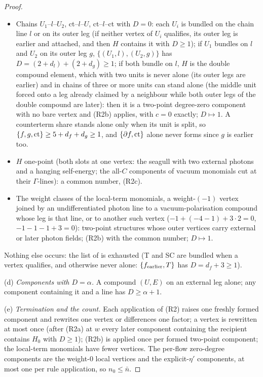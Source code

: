 \begin{proof}
\begin{itemize}[nosep,leftmargin=*]
\item Chains $U_1$--$l$--$U_2$, ct--$l$--$U$, ct--$l$--ct with $D=0$: each $U_i$ is bundled on the chain line $l$ or on its outer leg (if neither vertex of $U_i$ qualifies, its outer leg is earlier and attached, and then $H$ contains it with $D\ge1$); if $U_1$ bundles on $l$ and $U_2$ on its outer leg $g$, $\{(U_1,l),(U_2,g)\}$ has $D=(2+d_l)+(2+d_g)\ge1$; if both bundle on $l$, $H$ is the double compound element, which with two units is never alone (its outer legs are earlier) and in chains of three or more units can stand alone (the middle unit forced onto a leg already claimed by a neighbour while both outer legs of the double compound are later): then it is a two-point degree-zero component with no bare vertex and (R2b) applies, with $c=0$ exactly; $D\mapsto1$. A counterterm share stands alone only when its unit is split, so $\{f,g,{\rm ct}\}\ge5+d_f+d_g\ge1$, and $\{\partial f,{\rm ct}\}$ alone never forms since $g$ is earlier too.
\item $H$ one-point (both slots at one vertex: the seagull with two external photons and a hanging self-energy; the all-$C$ components of vacuum monomials cut at their $\Gamma$-lines): a common number, (R2c).
\item The weight classes of the local-term monomials, a weight-$(-1)$ vertex joined by an undifferentiated photon line to a vacuum-polarisation compound whose leg is that line, or to another such vertex ($-1+(-4-1)+3\cdot2=0$, $-1-1-1+3=0$): two-point structures whose outer vertices carry external or later photon fields; (R2b) with the common number; $D\mapsto1$.
\end{itemize}
Nothing else occurs: the list of  is exhausted (T and SC are bundled when a vertex qualifies, and otherwise never alone: $\{f_{\rm earlier},T\}$ has $D=d_f+3\ge1$).

(d) \emph{Components with $D=\alpha$.} A compound $(U,E)$ on an external leg alone; any component containing it and a line has $D\ge\alpha+1$.

(e) \emph{Termination and the count.} Each application of (R2) raises one freshly formed component and rewrites one vertex or differences one factor; a vertex is rewritten at most once (after (R2a) at $w$ every later component containing the recipient contains $H_0$ with $D\ge1$); (R2b) is applied once per formed two-point component; the local-term monomials have fewer vertices. The per-flow zero-degree components are the weight-$0$ local vertices and the explicit-$\eta'$ components, at most one per rule application, so $n_0\le\bar n$.
\end{proof}

